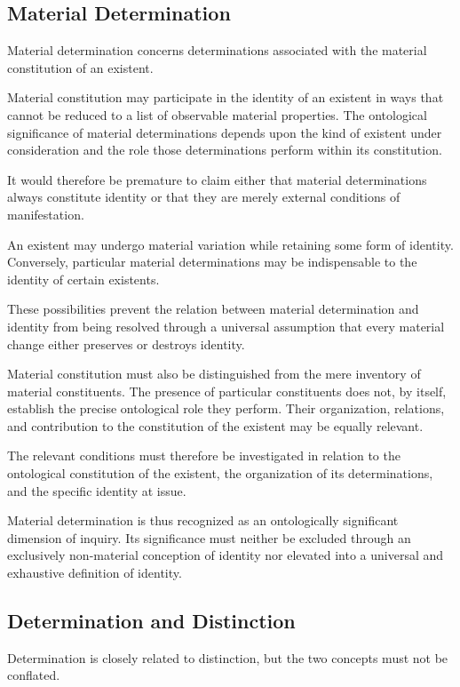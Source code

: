 \subsection{Material Determination}

Material determination concerns determinations associated
with the material constitution of an existent.

Material constitution may participate in the identity of
an existent in ways that cannot be reduced to a list of
observable material properties. The ontological significance
of material determinations depends upon the kind of existent
under consideration and the role those determinations
perform within its constitution.

It would therefore be premature to claim either that
material determinations always constitute identity or
that they are merely external conditions of manifestation.

An existent may undergo material variation while retaining
some form of identity. Conversely, particular material
determinations may be indispensable to the identity of
certain existents.

These possibilities prevent the relation between material
determination and identity from being resolved through
a universal assumption that every material change either
preserves or destroys identity.

Material constitution must also be distinguished from
the mere inventory of material constituents. The presence
of particular constituents does not, by itself, establish
the precise ontological role they perform. Their organization,
relations, and contribution to the constitution of the
existent may be equally relevant.

The relevant conditions must therefore be investigated
in relation to the ontological constitution of the existent,
the organization of its determinations, and the specific
identity at issue.

Material determination is thus recognized as an
ontologically significant dimension of inquiry. Its
significance must neither be excluded through an
exclusively non-material conception of identity nor
elevated into a universal and exhaustive definition
of identity.

\subsection{Determination and Distinction}

Determination is closely related to distinction, but the
two concepts must not be conflated.

